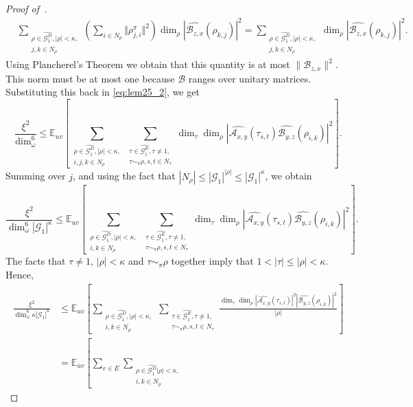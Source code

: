 \documentclass[a4paper,11pt]{article}
\theoremstyle{definition}
\newcommand{\ex}[1]{\mathbb{E}_{#1}}
\newcommand{\gr}{\mathscr{G}}
\newcommand{\A}{\mathcal{A}}
\newcommand{\B}{\mathcal{B}}
\begin{document}
\begin{proof}[Proof of~]
\begin{align*}
 &
 \sum_{\substack{\rho\in \widehat{\gr_1^D},
 |\rho| < \kappa, \\ j,k\in N_\rho}}
 \left(\sum_{i\in N_\rho}
 \Vert \rho^\pi_{j,i} \Vert^2 \right)
  \dim_\rho
  \left\vert
 \widehat{{\B}_{z,x}}(\rho_{k,j})
 \right\vert^2
 =
 \sum_{\substack{\rho\in \widehat{\gr_1^D},
 |\rho| < \kappa, \\ j,k\in N_\rho}}
 \dim_\rho
 \left\vert
 \widehat{{\B}_{z,x}}(\rho_{k,j})
 \right\vert^2.    
\end{align*}
Using Plancherel's Theorem we obtain that this quantity is at most $\lVert {\B}_{z,x}\rVert^2$. This norm must be at most one because $\B$ ranges over unitary matrices. Substituting this back in \eqref{eq:lem25_2}, we get
\[
\frac{\xi^2}{\dim_\omega^6} 
\leq 
\ex{uv}
\left[
\sum_{\substack{\rho\in \widehat{\gr_1^D},
 |\rho| < \kappa, \\ i,j,k\in N_\rho}}
 \sum_{\substack{\tau\in \widehat{\gr_1^E}, \tau\neq 1, \\ \tau \sim_\pi \rho, s,t \in N_\tau}}
 \dim_\tau \dim_\rho
 \left\vert
  \widehat{\A_{x,y}}(\tau_{s,t})
 \widehat{{\B}_{y,z}}(\rho_{i,k}) \right\vert^2 \right].
\]
Summing over $j$, and using the fact that $|N_\rho| \leq
|\gr_1|^{|\rho|} \leq |\gr_1|^\kappa$, we obtain
\[
\frac{\xi^2}{\dim_\omega^6 |\gr_1|^\kappa} 
\leq
\ex{uv}
\left[
\sum_{\substack{\rho\in \widehat{\gr_1^D},
 |\rho| < \kappa, \\ i,k\in N_\rho}}
 \sum_{\substack{\tau\in \widehat{\gr_1^E}, \tau\neq 1, \\ \tau \sim_\pi \rho, s,t \in N_\tau}}
  \dim_\tau \dim_\rho
 \left\vert
 \widehat{\A_{x,y}}(\tau_{s,t})
 \widehat{{\B}_{y,z}}(\rho_{i,k}) \right\vert^2\right].
\]
The facts that $\tau\neq 1$,
 $|\rho|<\kappa$ and $\tau \sim_\pi \rho$ together imply 
 that $1 < |\tau| \leq |\rho| < \kappa$.
 Hence,
\begin{align}
\nonumber
   \frac{\xi^2}{\dim_\omega^6 \kappa|\gr_1|^\kappa} 
& \leq 
\ex{uv}
\left[
\sum_{\substack{\rho\in \widehat{\gr_1^D},
 |\rho| < \kappa, \\ i,k\in N_\rho}}
 \sum_{\substack{\tau\in \widehat{\gr_1^E}, \tau\neq 1, \\ \tau \sim_\pi \rho, s,t \in N_\tau}}
 \frac{
  \dim_\tau \dim_\rho  \left\vert \widehat{\A_{x,y}}(\tau_{s,t})\right\vert^2
   \left\vert
 \widehat{{\B}_{y,z}}(\rho_{i,k})\right\vert^2}{|\rho|} 
 \right] \\
\nonumber
 &
= 
\ex{uv}
\left[
\sum_{e\in E}
\sum_{\substack{\rho\in \widehat{\gr_1^D} |\rho| < \kappa, \\ i,k\in N_\rho}}

\end{align}
\end{proof}
\end{document}
